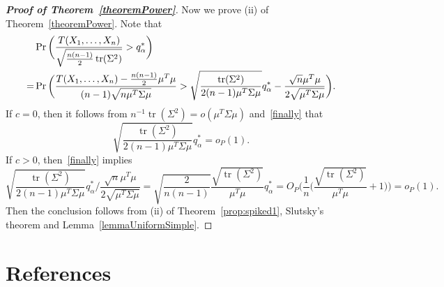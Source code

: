 \documentclass[3p]{elsarticle}
\DeclareMathOperator{\mytr}{tr}
\theoremstyle{plain}
\theoremstyle{definition}
\theoremstyle{remark}
\begin{document}
\begin{proof}[\textbf{Proof of Theorem~\ref{theoremPower}}]
Now we prove (ii) of Theorem~\ref{theoremPower}.
    Note that
    \begin{align}
        &\Pr\bigg(\frac{T( X_1,\ldots, X_n)}{\sqrt{\frac{n(n-1)}{2}\mytr(\Sigma^2)}}>q_{\alpha}^* \bigg)\nonumber\\
            =&
            \Pr\bigg(\frac{T( X_1,\ldots, X_n)-\frac{n(n-1)}{2}\mu^T\mu}{(n-1)\sqrt{ n \mu^T\Sigma\mu}}>
            \sqrt{\frac{\mytr(\Sigma^2)}{2(n-1)\mu^T\Sigma\mu}}q_{\alpha}^*-\frac{\sqrt{n}\mu^T\mu}{{2}\sqrt{  \mu^T\Sigma\mu}} \bigg).
        \notag
    \end{align}
    If $c=0$, then it follows from $n^{-1}\mytr(\Sigma^2)=o(\mu^T \Sigma \mu)$ and~\eqref{finally} that
    $$
    \sqrt{\frac{\mytr(\Sigma^2)}{2(n-1)\mu^T\Sigma\mu}}q_{\alpha}^*=o_P(1).
    $$
    If $c>0$, then~\eqref{finally} implies
    $$
    {
        \sqrt{\frac{\mytr(\Sigma^2)}{2(n-1)\mu^T\Sigma\mu}}q_{\alpha}^*
    }\bigg/{
        \frac{\sqrt{n}\mu^T\mu}{{2}\sqrt{  \mu^T\Sigma\mu}} 
    }
    =\sqrt{\frac{2}{n(n-1)}}\frac{\sqrt{\mytr(\Sigma^2)}}{\mu^T \mu} q_{\alpha}^*
    =O_P\Big(\frac{1}{n}\big(\frac{\sqrt{\mytr(\Sigma^2)}}{\mu^T \mu}+1\big)\Big)=o_P(1).
    $$
    Then the conclusion follows from (ii) of Theorem~\ref{prop:spiked1}, Slutsky's theorem and Lemma~\ref{lemmaUniformSimple}.
\end{proof}






\section*{References}

\end{document}
